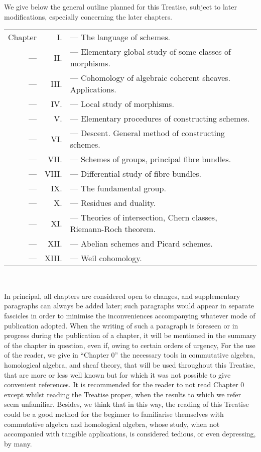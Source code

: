 \documentclass[../main.tex]{subfiles}
\begin{document}
\asttri

We give below the general outline planned for this Treatise, subject to later modifications, especially concerning the later chapters.

\begin{tabular}{rrl}
    Chapter & I. & --- The language of schemes.\\
    --- & II. & --- Elementary global study of some classes of morphisms.\\
    --- & III. & --- Cohomology of algebraic coherent sheaves. Applications.\\
    --- & IV. & --- Local study of morphisms.\\
    --- & V. & --- Elementary procedures of constructing schemes.\\
    --- & VI. & --- Descent. General method of constructing schemes.\\
    --- & VII. & --- Schemes of groups, principal fibre bundles.\\
    --- & VIII. & --- Differential study of fibre bundles.\\
    --- & IX. & --- The fundamental group.\\
    --- & X. & --- Residues and duality.\\
    --- & XI. & --- Theories of intersection, Chern classes, Riemann-Roch theorem.\\
    --- & XII. & --- Abelian schemes and Picard schemes.\\
    --- & XIII. & --- Weil cohomology.
\end{tabular}\\

\bigskip

In principal, all chapters are considered open to changes, and supplementary paragraphs can always be added later; such paragraphs would appear in separate fascicles in order to minimise the inconveniences accompanying whatever mode of publication adopted.
When the writing of such a paragraph is foreseen or in progress during the publication of a chapter, it will be mentioned in the summary of the chapter in question, even if, owing to certain orders of urgency, 
For the use of the reader, we give in ``Chapter 0'' the necessary tools in commutative algebra, homological algebra, and sheaf theory, that will be used throughout this Treatise, that are more or less well known but for which it was not possible to give convenient references.
It is recommended for the reader to not read Chapter 0 except whilst reading the Treatise proper, when the results to which we refer seem unfamiliar.
Besides, we think that in this way, the reading of this Treatise could be a good method for the beginner to familiarise themselves with commutative algebra and homological algebra, whose study, when not accompanied with tangible applications, is considered tedious, or even depressing, by many.
\end{document}
